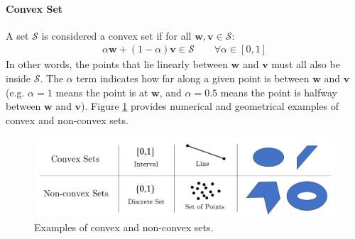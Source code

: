 \documentclass[11pt]{article}
\begin{document}
\paragraph{Convex Set} A set $\mathcal{S}$ is considered a convex set if for all $\boldsymbol{w}, \boldsymbol{v} \in \mathcal{S}$:
\begin{align}
    \alpha \boldsymbol{w} + (1 - \alpha) \boldsymbol{v} \in \mathcal{S} \quad \quad \forall \alpha \in [0,1]
\end{align}
In other words, the points that lie linearly between $\boldsymbol{w}$ and $\boldsymbol{v}$ must all also be inside $\mathcal{S}$. The $\alpha$ term indicates how far along a given point is between $\boldsymbol{w}$ and $\boldsymbol{v}$ (e.g. $\alpha=1$ means the point is at $\boldsymbol{w}$, and $\alpha=0.5$ means the point is halfway between $\boldsymbol{w}$ and $\boldsymbol{v}$). Figure \ref{fig:convex_sets} provides numerical and geometrical examples of convex and non-convex sets.

\begin{figure}[h]
\includegraphics[scale=0.5]{imgs/convex_sets.png}
\centering
\caption{Examples of convex and non-convex sets.}
\label{fig:convex_sets}
\end{figure}
\end{document}
